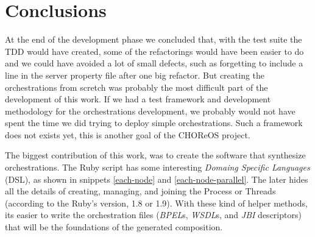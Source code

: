 \section{Conclusions}


At the end of the development phase we concluded that, with the test suite the TDD would have created, some of the refactorings would have been easier to do and we could have avoided a lot of small defects, such as forgetting to include a line in the server property file after one big refactor. But creating the orchestrations from scretch was probably the most difficult part of the development of this work. If we had a test framework and development methodology for the orchestrations development, we probably would not have spent the time we did trying to deploy simple orchestrations. Such a framework does not exists yet, this is another goal of the CHOReOS project.

The biggest contribution of this work, was to create the software that synthesize orchestrations. The Ruby script has some interesting \emph{Domaing Specific Languages} (DSL), as shown in snippets \ref{each-node} and  \ref{each-node-parallel}. The later hides all the details of creating, managing, and joining the Process or Threads (according to the Ruby's version, 1.8 or 1.9). With these kind of helper methods, its easier to write the orchestration files (\emph{BPEL}s, \emph{WSDL}s, and \emph{JBI} descriptors) that will be the foundations of the generated composition.




